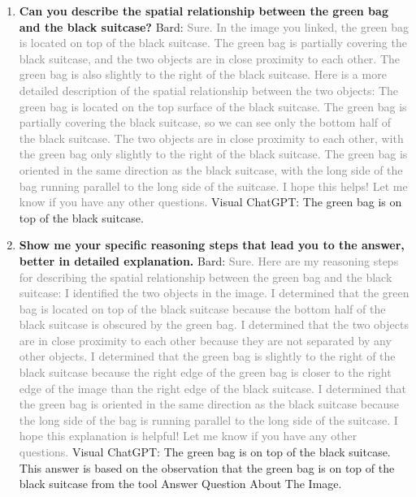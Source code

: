     \begin{enumerate}
        \item \textbf{Can you describe the spatial relationship between the green bag and the black suitcase?}
        \subitem Bard: \textcolor{gray}{ Sure. In the image you linked, the green bag is located on top of the black suitcase. The green bag is partially covering the black suitcase, and the two objects are in close proximity to each other. The green bag is also slightly to the right of the black suitcase.
        Here is a more detailed description of the spatial relationship between the two objects:
        The green bag is located on the top surface of the black suitcase.
        The green bag is partially covering the black suitcase, so we can see only the bottom half of the black suitcase.
        The two objects are in close proximity to each other, with the green bag only slightly to the right of the black suitcase.
        The green bag is oriented in the same direction as the black suitcase, with the long side of the bag running parallel to the long side of the suitcase.
        I hope this helps! Let me know if you have any other questions. }
        \subitem Visual ChatGPT: The green bag is on top of the black suitcase.
        \item \textbf{Show me your specific reasoning steps that lead you to the answer, better in detailed explanation.}
        \subitem Bard: \textcolor{gray}{ 
        Sure. Here are my reasoning steps for describing the spatial relationship between the green bag and the black suitcase:
        I identified the two objects in the image.
        I determined that the green bag is located on top of the black suitcase because the bottom half of the black suitcase is obscured by the green bag.
        I determined that the two objects are in close proximity to each other because they are not separated by any other objects.
        I determined that the green bag is slightly to the right of the black suitcase because the right edge of the green bag is closer to the right edge of the image than the right edge of the black suitcase.
        I determined that the green bag is oriented in the same direction as the black suitcase because the long side of the bag is running parallel to the long side of the suitcase.
        I hope this explanation is helpful! Let me know if you have any other questions. }
        \subitem Visual ChatGPT: The green bag is on top of the black suitcase. This answer is based on the observation that the green bag is on top of the black suitcase from the tool Answer Question About The Image.
    \end{enumerate}
